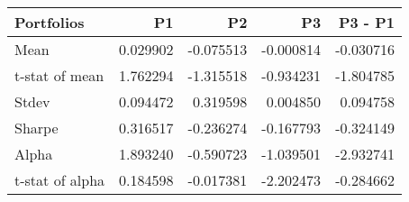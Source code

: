 \begin{tabular}{lrrrr}
\toprule
Portfolios & P1 & P2 & P3 & P3 - P1 \\
\midrule
Mean & 0.029902 & -0.075513 & -0.000814 & -0.030716 \\
t-stat of mean & 1.762294 & -1.315518 & -0.934231 & -1.804785 \\
Stdev & 0.094472 & 0.319598 & 0.004850 & 0.094758 \\
Sharpe & 0.316517 & -0.236274 & -0.167793 & -0.324149 \\
Alpha & 1.893240 & -0.590723 & -1.039501 & -2.932741 \\
t-stat of alpha & 0.184598 & -0.017381 & -2.202473 & -0.284662 \\
\bottomrule
\end{tabular}
